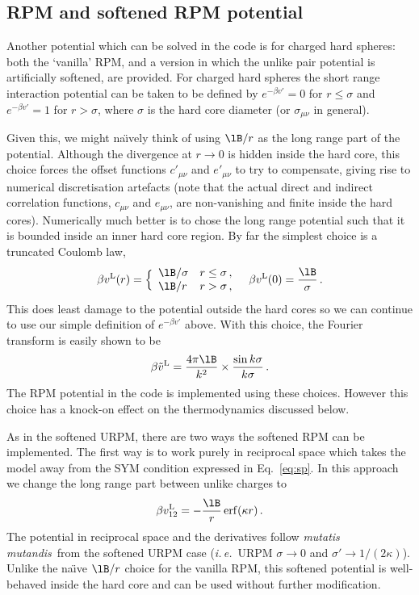 \documentclass[12pt,a4paper]{article}
\DeclareMathOperator{\erf}{erf}
\newcommand{\latin}[1]{\emph{#1}}
\newcommand{\ie}{\latin{i.\,e.}}
\newcommand{\mutmut}{\latin{mutatis mutandis}}
\newcommand{\lr}{^{\mathrm{L}}}
\newcommand{\Eqref}[1]{Eq.~\eqref{#1}}
\begin{document}
\subsection{RPM and softened RPM potential}
\label{sec:softRPM}
%
Another potential which can be solved in the code is for charged hard
spheres: both the `vanilla' RPM, and a version in which the unlike
pair potential is artificially softened, are provided.  For charged
hard spheres the short range interaction potential can be taken to be
defined by $e^{-\beta v'}=0$ for $r\le\sigma$ and $e^{-\beta v'}=1$
for $r>\sigma$, where $\sigma$ is the hard core diameter (or $\sigma_{\mu\nu}$ in general).

Given this, we might na\"\i{}vely think of using $\lB/r$ as the long
range part of the potential.  Although the divergence at $r\to0$ is
hidden inside the hard core, this choice forces the offset functions
$c'_{\mu\nu}$ and $e'_{\mu\nu}$ to try to compensate, giving rise to
numerical discretisation artefacts (note that the actual direct and
indirect correlation functions, $c_{\mu\nu}$ and $e_{\mu\nu}$, are
non-vanishing and finite inside the hard cores).  Numerically much
better is to chose the long range potential such that it is bounded
inside an inner hard core region.  By far the simplest choice is a
truncated Coulomb law,
%
\begin{equation}
  \beta v\lr(r)=\Bigl\{\begin{array}{ll}
  \lB/\sigma & r\le\sigma\,,\\
  \lB/r & r > \sigma\,,
  \end{array}\quad \beta v\lr(0)=\frac{\lB}{\sigma}\,.\label{eq:rpmhc}
\end{equation}
%
This does least damage to the potential outside the hard cores so we
can continue to use our simple definition of $e^{-\beta v'}$ above.
With this choice, the Fourier transform is easily shown to be
%
\begin{equation}
  \beta {\tilde v}\lr=\frac{4\pi\lB}{k^2}\times\frac{\sin k\sigma}{k\sigma}\,.
\end{equation}
%
The RPM potential in the code is implemented using these
choices. However this choice has a knock-on effect on the
thermodynamics discussed below.

As in the softened URPM, there are two ways the softened RPM can be
implemented.  The first way is to work purely in reciprocal space
which takes the model away from the SYM condition expressed in
\Eqref{eq:sp}.  In this approach we change the long range part between
unlike charges to
%
\begin{equation}
\beta v_{12}\lr=-\frac{\lB}{r} \erf(\kappa r)\,.
\end{equation}
%
The potential in reciprocal space and the derivatives follow
\mutmut\ from the softened URPM case (\ie\ URPM $\sigma\to0$ and
$\sigma'\to1/(2\kappa)$).  Unlike the na\"\i{}ve $\lB/r$ choice for
the vanilla RPM, this softened potential is well-behaved inside the
hard core and can be used without further modification.
  
\end{document}

